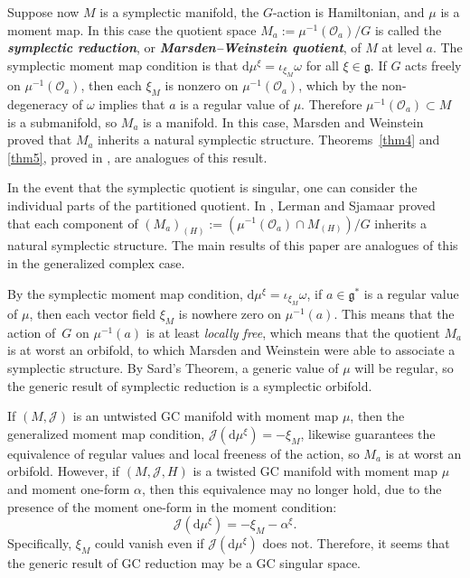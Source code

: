 \documentclass[11pt]{article}
\numberwithin{equation}{section}
\newcommand{\deff}[1]{\textbf{\emph{#1}}}
\begin{document}
Suppose now $M$ is a symplectic manifold, the $G$-action is Hamiltonian, and $\mu$ is a moment map.  In this case the quotient space $M_a := \mu^{-1}(\mathcal{O}_a) / G$ is called the \deff{symplectic reduction}, or \deff{Marsden--Weinstein quotient}, of $M$ at level $a$.
The symplectic moment map condition is that $\mathrm{d} \mu^{\xi} = \iota_{\xi_M} \omega$ for all $\xi \in \mathfrak{g}$.  If $G$ acts freely on $\mu^{-1}(\mathcal{O}_a)$, then each $\xi_M$ is nonzero on $\mu^{-1}(\mathcal{O}_a)$, which by the non-degeneracy of $\omega$ implies that $a$ is a regular value of $\mu$.  Therefore $\mu^{-1}(\mathcal{O}_a) \subset M$ is a submanifold, so $M_a$ is a manifold.  In this case, Marsden and Weinstein proved that $M_a$ inherits a natural symplectic structure.  Theorems~\ref{thm4} and \ref{thm5}, proved in \cite{lintolman}, are analogues of this result.

In the event that the symplectic quotient is singular, one can consider the individual parts of the partitioned quotient.
In \cite{stratified}, Lerman and Sjamaar proved that each component of $\left( M_{a} \right)_{(H)} := \left( \mu^{-1}(\mathcal{O}_a) \cap M_{(H)} \right) / G$ inherits a natural symplectic structure.
The main results of this paper are analogues of this in the generalized complex case.


\begin{Remark} \label{rem3}
By the symplectic moment map condition, $\mathrm{d} \mu^{\xi} = \iota_{\xi_M} \omega$, if $a \in \mathfrak{g}^*$ is a regular value of $\mu$, then each vector f\/ield $\xi_M$ is nowhere zero on $\mu^{-1}(a)$.  This means that the action of~$G$ on $\mu^{-1}(a)$ is at least \emph{locally free}, which means that the quotient $M_a$ is at worst an orbifold, to which Marsden and Weinstein were able to associate a symplectic structure.  By Sard's Theorem, a generic value of $\mu$ will be regular, so the generic result of symplectic reduction is a symplectic orbifold.

If $(M,\mathcal{J})$ is an untwisted GC manifold with moment map $\mu$, then the generalized moment map condition, $\mathcal{J}(\mathrm{d} \mu^{\xi}) = -\xi_M$, likewise guarantees the equivalence of regular values and local freeness of the action, so $M_a$ is at worst an orbifold.  However, if $(M,\mathcal{J},H)$ is a twisted GC manifold with moment map $\mu$ and moment one-form $\alpha$, then this equivalence may no longer hold, due to the presence of the moment one-form in the moment condition:
\[
  \mathcal{J}(\mathrm{d} \mu^{\xi}) = -\xi_M - \alpha^{\xi}.
\]
Specif\/ically, $\xi_M$ could vanish even if $\mathcal{J}(\mathrm{d} \mu^{\xi})$ does not.  Therefore, it seems that the generic result of GC reduction may be a GC singular space.
\end{Remark}
\end{document}
